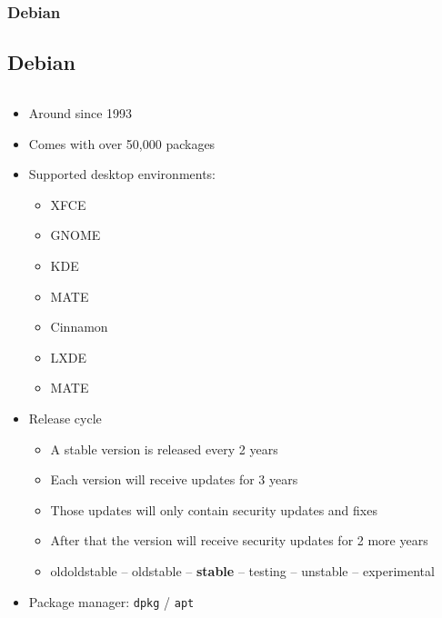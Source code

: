 \begin{frame}
	\frametitle{Debian}
	\subsection{Debian}
	
	\vfill
	\begin{columns}
		\begin{column}{.65\linewidth}
			\begin{itemize}
				\item Around since 1993
				\item Comes with over 50,000 packages
				\item Supported desktop environments:
					\begin{tiny}
						\begin{itemize}
							\item XFCE
							\item GNOME
							\item KDE
							\item MATE
							\item Cinnamon
							\item LXDE
							\item MATE
						\end{itemize}
					\end{tiny}
				\item Release cycle
					\begin{itemize}
						\item A stable version is released every 2 years
						\item Each version will receive updates for 3 years
						\item Those updates will only contain security updates and fixes
						\item After that the version will receive security updates for 2 more years
						\item oldoldstable – oldstable – \textbf{stable} – testing
						– unstable – experimental
					\end{itemize}
				\item Package manager: \texttt{dpkg} / \texttt{apt}
			\end{itemize}
		\end{column}
		\hfill
		\begin{column}{.34\linewidth}

\end{column}
\end{columns}
\end{frame}
